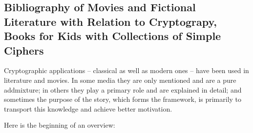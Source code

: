 \newpage
\hypertarget{appendix-movies}{}%
\subsection{Bibliography of Movies and Fictional Literature with Relation
to Cryptograpy, Books for Kids with Collections of Simple Ciphers}
\label{s:appendix-movies}


Cryptographic applications -- classical as well as modern ones -- have been
used in literature and movies. In some media they are only mentioned and
are a pure addmixture; in others they play a primary role and are explained
in detail; and sometimes the purpose of the story, which forms the framework,
is primarily to transport this knowledge and achieve better motivation.

Here is the beginning of an overview:

